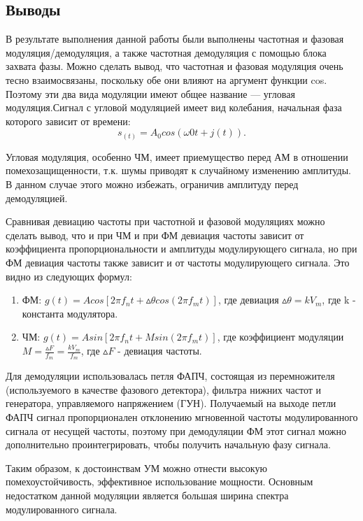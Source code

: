 \documentclass[10pt,a4paper]{article}
\begin{document}
\subsection{Выводы}
В результате выполнения данной работы были выполнены частотная и фазовая модуляция/демодуляция, а также частотная демодуляция с  помощью блока захвата фазы. Можно сделать вывод, что частотная и фазовая модуляция очень тесно взаимосвязаны, поскольку обе они влияют на аргумент функции cos. Поэтому эти два вида модуляции имеют общее название — угловая модуляция.Сигнал с угловой модуляцией имеет вид колебания, начальная фаза которого зависит от времени:
	\begin{equation}
	s_(t) = A_0 cos(\omega0 t + j(t)).
	\end{equation}

Угловая модуляция, особенно ЧМ, имеет приемущество перед АМ в отношении помехозащищенности, т.к. шумы приводят к случайному изменению амплитуды. В данном случае этого можно избежать, ограничив амплитуду перед демодуляцией.

Сравнивая девиацию частоты при частотной и фазовой модуляциях можно сделать вывод, что и при ЧМ и при ФМ девиация частоты зависит от коэффициента пропорциональности и амплитуды модулирующего сигнала, но при  ФМ девиация частоты также зависит и от частоты модулирующего сигнала. Это видно из следующих формул:
\begin{enumerate}
		\item ФМ: $g(t) = Acos[2\pi f_n t+ \vartriangle\theta cos(2\pi f_m t)]$, где девиация $\vartriangle\theta =  kV_m$, где k - константа модулятора.
		\item ЧМ: $g(t) = Asin[2\pi f_n t+ M sin(2\pi f_m t)]$, где коэффициент модуляции $M = \frac{\vartriangle F}{f_m} = \frac{kV_m}{f_m}$, где $\vartriangle F$  - девиация частоты.
	\end{enumerate}
	
Для демодуляции использовалась петля ФАПЧ, состоящая из перемножителя (используемого в качестве фазового детектора), фильтра нижних частот и генератора, управляемого напряжением (ГУН). Получаемый на выходе петли ФАПЧ сигнал пропорционален отклонению мгновенной частоты модулированного сигнала от несущей частоты, поэтому при демодуляции ФМ этот сигнал можно дополнительно проинтегрировать, чтобы получить начальную фазу сигнала.

Таким образом, к достоинствам УМ можно отнести высокую помехоустойчивость, эффективное использование мощности.
Основным недостатком данной модуляции является большая ширина спектра модулированного сигнала.
\end{document}
